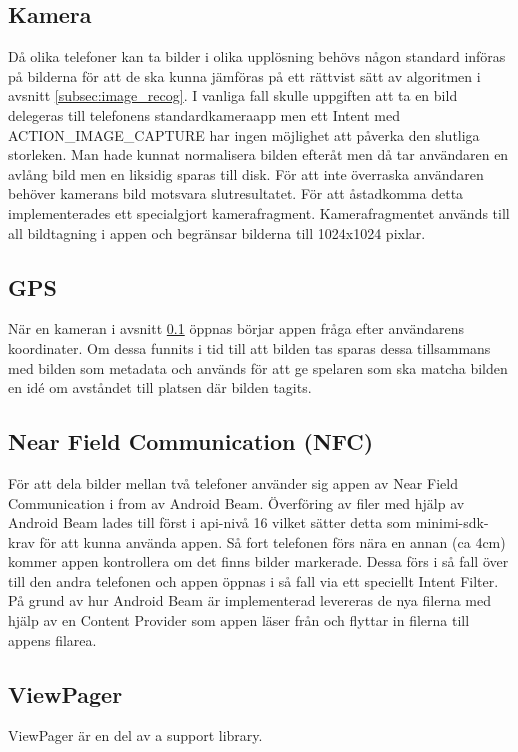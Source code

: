 \documentclass[11px, a4paper]{article}
\begin{document}
\subsection{Kamera}
\label{subsec:camera}
	Då olika telefoner kan ta bilder i olika upplösning behövs någon standard införas på bilderna för att de ska kunna jämföras på ett rättvist sätt av algoritmen i avsnitt \ref{subsec:image_recog}. I vanliga fall skulle uppgiften att ta en bild delegeras till telefonens standardkameraapp men ett Intent med ACTION\_IMAGE\_CAPTURE har ingen möjlighet att påverka den slutliga storleken. Man hade kunnat normalisera bilden efteråt men då tar användaren en avlång bild men en liksidig sparas till disk. För att inte överraska användaren behöver kamerans bild motsvara slutresultatet. För att åstadkomma detta implementerades ett specialgjort kamerafragment. Kamerafragmentet används till all bildtagning i appen och begränsar bilderna till 1024x1024 pixlar.

\subsection{GPS}
	När en kameran i avsnitt \ref{subsec:camera} öppnas börjar appen fråga efter användarens koordinater. Om dessa funnits i tid till att bilden tas sparas dessa tillsammans med bilden som metadata och används för att ge spelaren som ska matcha bilden en idé om avståndet till platsen där bilden tagits.

\subsection{Near Field Communication (NFC)}
	För att dela bilder mellan två telefoner använder sig appen av Near Field Communication i from av Android Beam. Överföring av filer med hjälp av Android Beam lades till först i api-nivå 16 vilket sätter detta som minimi-sdk-krav för att kunna använda appen. Så fort telefonen förs nära en annan (ca 4cm) kommer appen kontrollera om det finns bilder markerade. Dessa förs i så fall över till den andra telefonen och appen öppnas i så fall via ett speciellt Intent Filter. På grund av hur Android Beam är implementerad levereras de nya filerna med hjälp av en Content Provider som appen läser från och flyttar in filerna till appens filarea.

\subsection{ViewPager}
	ViewPager är en del av a support library.
\end{document}
